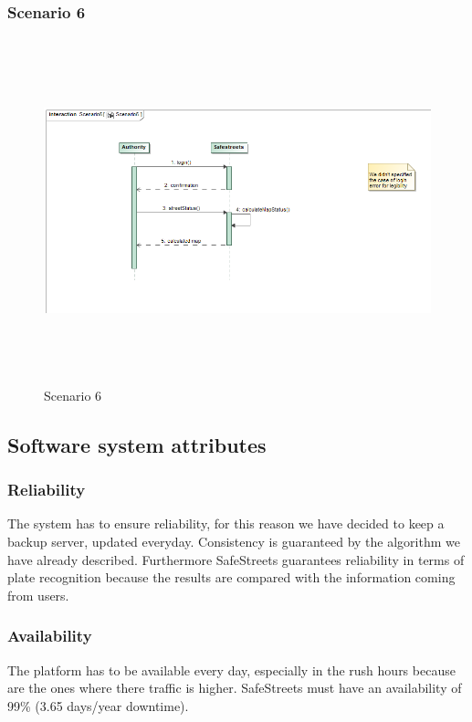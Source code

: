 \subsubsection{Scenario 6}
\begin{figure}[H]
	\begin{minipage}[b]{0.40\textwidth}
		\includegraphics[width=15cm,height=10cm]{Images/SequenceRASD/Scenario6.png}
		\caption{Scenario 6}
	\end{minipage}
\end{figure}

\subsection{Software system attributes}
\subsubsection{Reliability}
The system has to ensure reliability, for this reason we have decided to keep a backup server, updated everyday.
Consistency is guaranteed by the algorithm we have already described.
Furthermore SafeStreets guarantees reliability in terms of plate recognition because the results are compared with the information coming from users.

\subsubsection{Availability}
The platform has to be available every day, especially in the rush hours because are the ones where there traffic is higher.
 SafeStreets must have an availability of 99\% (3.65 days/year downtime).
 
